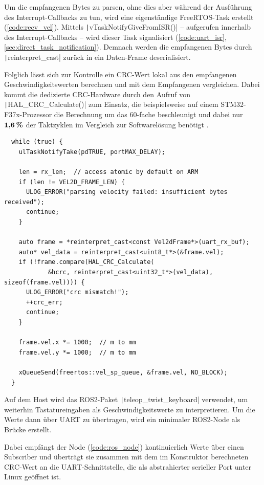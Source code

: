 Um die empfangenen Bytes zu parsen, ohne dies aber während der Ausführung des
Interrupt-Callbacks zu tun, wird eine eigenständige FreeRTOS-Task erstellt
(\ref{code:recv_vel}). Mittels \texttt|vTaskNotifyGiveFromISR()| --
aufgerufen innerhalb des Interrupt-Callbacks -- wird dieser Task signalisiert
(\ref{code:uart_isr}, \ref{sec:direct_task_notification}). Demnach werden die
empfangenen Bytes durch \texttt|reinterpret_cast| zurück in ein
Daten-Frame deserialisiert.

Folglich lässt sich zur Kontrolle ein CRC-Wert lokal aus den empfangenen
Geschwindigkeitswerten berechnen und mit dem Empfangenen vergleichen. Dabei
kommt die dedizierte CRC-Hardware durch den Aufruf von
\texttt|HAL_CRC_Calculate()| zum Einsatz, die beispielsweise auf einem
STM32-F37x-Prozessor die Berechnung um das 60-fache beschleunigt und dabei nur
$\textbf{1,6\,\%}$ der Taktzyklen im Vergleich zur Softwarelösung benötigt
\cite[S. 9]{AN4187}.

\begin{code}
\begin{verbatim}
  while (true) {
    ulTaskNotifyTake(pdTRUE, portMAX_DELAY);

    len = rx_len;  // access atomic by default on ARM
    if (len != VEL2D_FRAME_LEN) {
      ULOG_ERROR("parsing velocity failed: insufficient bytes received");
      continue;
    }

    auto frame = *reinterpret_cast<const Vel2dFrame*>(uart_rx_buf);
    auto* vel_data = reinterpret_cast<uint8_t*>(&frame.vel);
    if (!frame.compare(HAL_CRC_Calculate(
            &hcrc, reinterpret_cast<uint32_t*>(vel_data), sizeof(frame.vel)))) {
      ULOG_ERROR("crc mismatch!");
      ++crc_err;
      continue;
    }

    frame.vel.x *= 1000;  // m to mm
    frame.vel.y *= 1000;  // m to mm

    xQueueSend(freertos::vel_sp_queue, &frame.vel, NO_BLOCK);
  }
\end{verbatim}
    \label{code:recv_vel}
\end{code}

Auf dem Host wird das ROS2-Paket \texttt|teleop_twist_keyboard|
verwendet, um weiterhin Tastatureingaben als Geschwindigkeitswerte zu
interpretieren. Um die Werte dann über UART zu übertragen, wird ein minimaler
ROS2-Node als Brücke erstellt.

Dabei empfängt der Node (\ref{code:ros_node}) kontinuierlich Werte über einen
Subscriber und überträgt sie zusammen mit dem im Konstruktor berechneten
CRC-Wert an die UART-Schnittstelle, die als abstrahierter serieller Port unter
Linux geöffnet ist.

